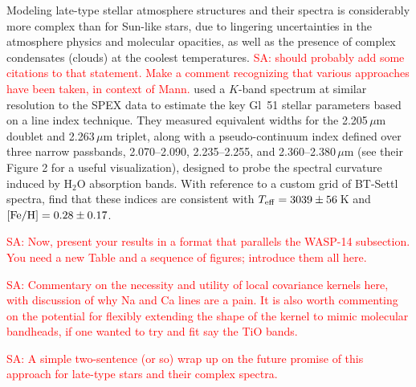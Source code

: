 \documentclass[iop,floatfix]{emulateapj}
\newcommand{\comm}[1]{ \textcolor{red}{SA: #1}}
\begin{document}
Modeling late-type stellar atmosphere structures and their spectra is considerably more complex 
than for Sun-like stars, due to lingering uncertainties in the atmosphere physics and molecular 
opacities, as well as the presence of complex condensates (clouds) at the coolest temperatures.  
\comm{should probably add some citations to that statement.  Make a comment recognizing that 
various approaches have been taken, in context of Mann.}  \citet{rojas-ayala12} used a $K$-band 
spectrum at similar resolution to the SPEX data to estimate the key Gl~51 stellar parameters based 
on a line index technique.  They measured equivalent widths for the 2.205\,$\mu$m  
doublet and 2.263\,$\mu$m  triplet, along with a pseudo-continuum index defined over 
three narrow passbands, 2.070--2.090, 2.235--2.255, and 2.360--2.380\,$\mu$m (see their Figure 2 
for a useful visualization), designed to probe the spectral curvature induced by H$_2$O absorption 
bands.  With reference to a custom grid of {\sc BT-Settl} spectra, \citet{rojas-ayala12} find that 
these indices are consistent with $T_{\rm eff} = 3039\pm56$\,K and $[{\rm Fe/H}] = 0.28\pm0.17$.  

\comm{Now, present your results in a format that parallels the WASP-14 subsection.  You need a new 
Table and a sequence of figures; introduce them all here.}

\comm{Commentary on the necessity and utility of local covariance kernels here, with discussion of why Na and Ca 
lines are a pain.  It is also worth commenting on the potential for flexibly extending the shape of 
the kernel to mimic molecular bandheads, if one wanted to try and fit say the TiO bands.}

\comm{A simple two-sentence (or so) wrap up on the future promise of this approach for late-type 
stars and their complex spectra.}
\end{document}
